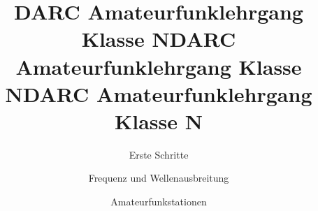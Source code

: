 \documentclass[aspectratio = 169]{beamer}
\begin{document}

\title{DARC Amateurfunklehrgang Klasse N}
\author{Erste Schritte}
\begin{frame}
\maketitle
\end{frame}










\title{DARC Amateurfunklehrgang Klasse N}
\author{Frequenz und Wellenausbreitung}
\begin{frame}
\maketitle
\end{frame}




















\title{DARC Amateurfunklehrgang Klasse N}
\author{Amateurfunkstationen}
\begin{frame}
\maketitle
\end{frame}














\end{document}
